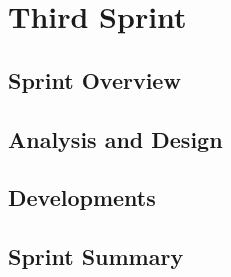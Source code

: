 \chapter{Third Sprint}\label{chap:sprint3}

\section{Sprint Overview}


\section{Analysis and Design}\label{sec:sprint3:analysis}




\section{Developments}\label{sec:sprint3:developments}











\section{Sprint Summary}
